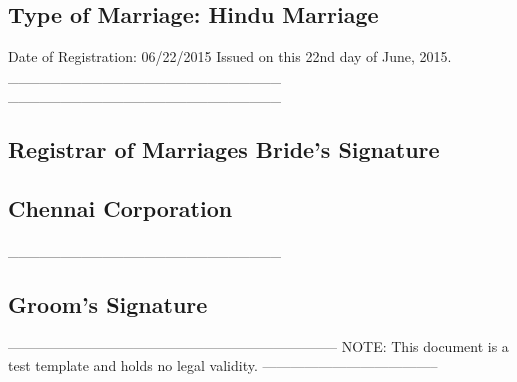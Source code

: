 \subsection*{Type of Marriage: Hindu Marriage}

Date of Registration: 06/22/2015 Issued on this 22nd day of June, 2015. \_\_\_\_\_\_\_\_\_\_\_\_\_\_\_\_\_\_\_\_\_\_\_\_\_\_ \_\_\_\_\_\_\_\_\_\_\_\_\_\_\_\_\_\_\_\_\_\_\_\_\_\_

\subsection*{Registrar of Marriages Bride's Signature}

\subsection*{Chennai Corporation}

\_\_\_\_\_\_\_\_\_\_\_\_\_\_\_\_\_\_\_\_\_\_\_\_\_\_

\subsection*{Groom's Signature}

----------------------------------------------------------------------- NOTE: This document is a test template and holds no legal validity. --------------------------------------